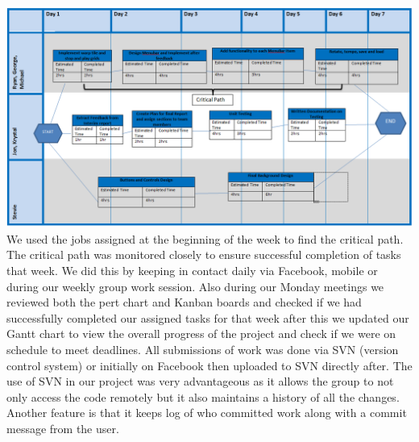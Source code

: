 \documentclass[10pt,a4paper]{article}
\begin{document}
\\
\includegraphics[scale=0.5]{pert.png}\\
We used the jobs assigned at the beginning of the week to find the critical path. The critical path was monitored closely to ensure successful completion of tasks that week. We did this by keeping in contact daily via Facebook, mobile or during our weekly group work session. Also during our Monday meetings we reviewed both the pert chart and Kanban boards and checked if we had successfully completed our assigned tasks for that week after this we updated our Gantt chart to view the overall progress of the project and check if we were on schedule to meet deadlines. All submissions of work was done via SVN (version control system) or initially on Facebook then uploaded to SVN directly after. The use of SVN in our project was very advantageous as it allows the group to not only access the code remotely but it also maintains a history of all the changes. Another feature is that it keeps log of who committed work along with a commit message from the user. \\
\\
\end{document}
